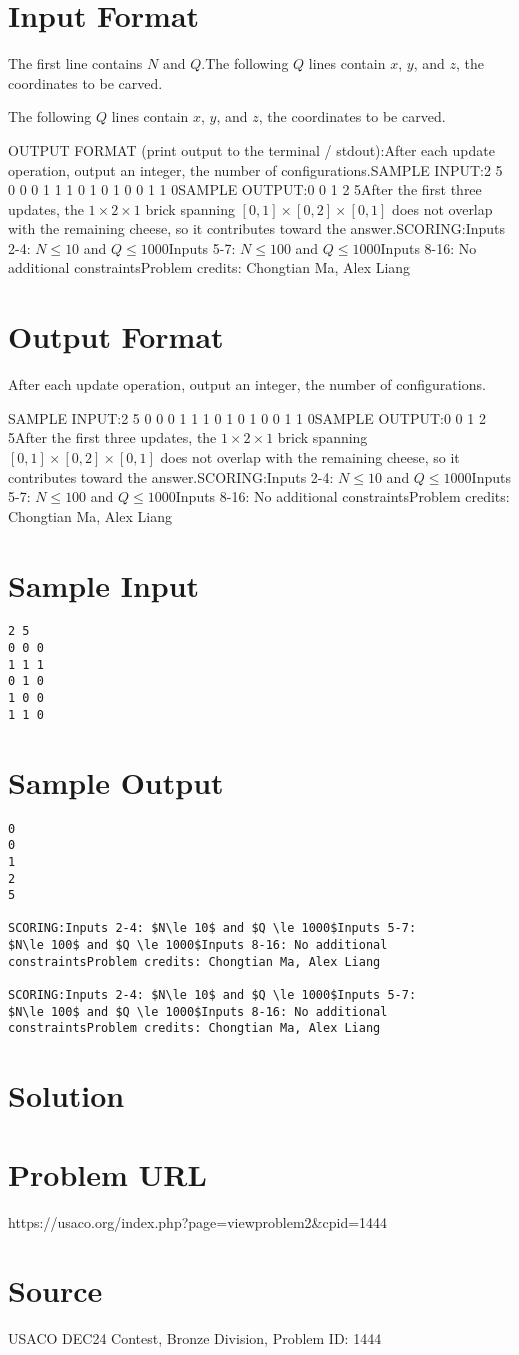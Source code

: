 \documentclass[12pt]{article}
\begin{document}
\section*{Input Format}
The first line contains $N$ and $Q$.The following $Q$ lines contain $x$, $y$, and $z$, the coordinates to be carved.

The following $Q$ lines contain $x$, $y$, and $z$, the coordinates to be carved.

OUTPUT FORMAT (print output to the terminal / stdout):After each update operation, output an integer, the number of configurations.SAMPLE INPUT:2 5
0 0 0
1 1 1
0 1 0
1 0 0
1 1 0SAMPLE OUTPUT:0
0
1
2
5After the first three updates, the $1\times 2 \times 1$ brick spanning 
$[0, 1]\times [0, 2]\times [0, 1]$ does not overlap with the remaining cheese,
so it contributes toward the answer.SCORING:Inputs 2-4: $N\le 10$ and $Q \le 1000$Inputs 5-7:
$N\le 100$ and $Q \le 1000$Inputs 8-16: No additional
constraintsProblem credits: Chongtian Ma, Alex Liang

\section*{Output Format}
After each update operation, output an integer, the number of configurations.

SAMPLE INPUT:2 5
0 0 0
1 1 1
0 1 0
1 0 0
1 1 0SAMPLE OUTPUT:0
0
1
2
5After the first three updates, the $1\times 2 \times 1$ brick spanning 
$[0, 1]\times [0, 2]\times [0, 1]$ does not overlap with the remaining cheese,
so it contributes toward the answer.SCORING:Inputs 2-4: $N\le 10$ and $Q \le 1000$Inputs 5-7:
$N\le 100$ and $Q \le 1000$Inputs 8-16: No additional
constraintsProblem credits: Chongtian Ma, Alex Liang

\section*{Sample Input}
\begin{verbatim}
2 5
0 0 0
1 1 1
0 1 0
1 0 0
1 1 0
\end{verbatim}

\section*{Sample Output}
\begin{verbatim}
0
0
1
2
5

SCORING:Inputs 2-4: $N\le 10$ and $Q \le 1000$Inputs 5-7:
$N\le 100$ and $Q \le 1000$Inputs 8-16: No additional
constraintsProblem credits: Chongtian Ma, Alex Liang

SCORING:Inputs 2-4: $N\le 10$ and $Q \le 1000$Inputs 5-7:
$N\le 100$ and $Q \le 1000$Inputs 8-16: No additional
constraintsProblem credits: Chongtian Ma, Alex Liang
\end{verbatim}

\section*{Solution}


\section*{Problem URL}
https://usaco.org/index.php?page=viewproblem2&cpid=1444

\section*{Source}
USACO DEC24 Contest, Bronze Division, Problem ID: 1444
\end{document}

